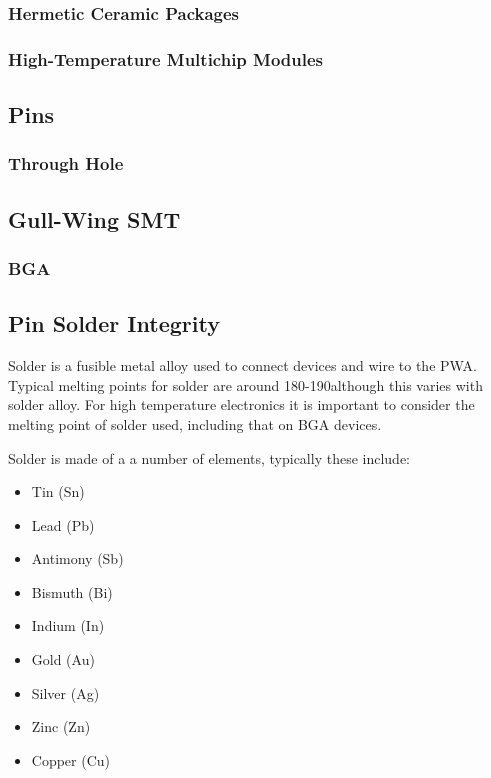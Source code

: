 \documentclass{article}
\begin{document}
		\subsubsection{Hermetic Ceramic Packages}
		\subsubsection{High-Temperature Multichip Modules}
	
	\subsection{Pins}
		\subsubsection{Through Hole}
		\subsection{Gull-Wing SMT}
		\subsubsection{BGA}
	
	\subsection{Pin Solder Integrity}
		Solder is a fusible metal alloy used to connect devices and wire to the PWA.
		Typical melting points for solder are around 180-190\degree although this varies with solder alloy. 
		For high temperature electronics it is important to consider the melting point of solder used, including that on BGA devices.
				
		Solder is made of a a number of elements, typically these include:
		\begin{itemize}
			\item Tin (Sn)
			\item Lead (Pb)
			\item Antimony (Sb)
			\item Bismuth (Bi)
			\item Indium (In)
			\item Gold (Au)
			\item Silver (Ag)
			\item Zinc (Zn)
			\item Copper (Cu)
		\end{itemize}
		
\end{document}
